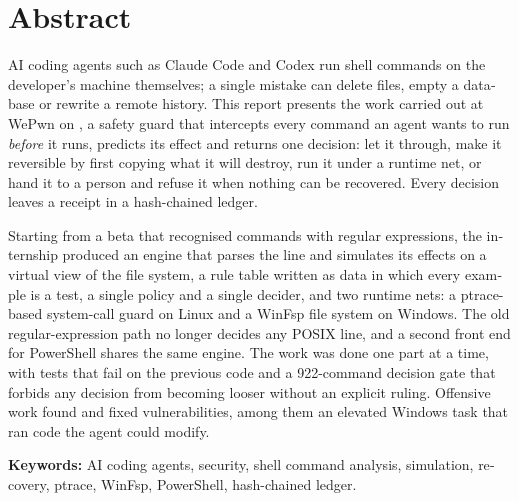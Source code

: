 \chapter*{Abstract}
\begin{otherlanguage}{english}
AI coding agents such as Claude Code and Codex run shell commands on the developer's machine
themselves; a single mistake can delete files, empty a database or rewrite a remote history.
This report presents the work carried out at WePwn on \demo{}, a safety guard that intercepts
every command an agent wants to run \emph{before} it runs, predicts its effect and returns one
decision: let it through, make it reversible by first copying what it will destroy, run it
under a runtime net, or hand it to a person and refuse it when nothing can be recovered. Every
decision leaves a receipt in a hash-chained ledger.

Starting from a beta that recognised commands with regular expressions, the internship
produced an engine that parses the line and simulates its effects on a virtual view of the
file system, a rule table written as data in which every example is a test, a single policy
and a single decider, and two runtime nets: a ptrace-based system-call guard on Linux and a
WinFsp file system on Windows. The old regular-expression path no longer decides any POSIX line, and a second front end for
PowerShell shares the same engine. The
work was done one part at a time, with tests that fail on the previous code and a
922-command decision gate that forbids any decision from becoming looser without an explicit
ruling. Offensive work found and fixed vulnerabilities, among them an elevated Windows task
that ran code the agent could modify.

\medskip
\noindent\textbf{Keywords:} AI coding agents, security, shell command analysis, simulation,
recovery, ptrace, WinFsp, PowerShell, hash-chained ledger.
\end{otherlanguage}
